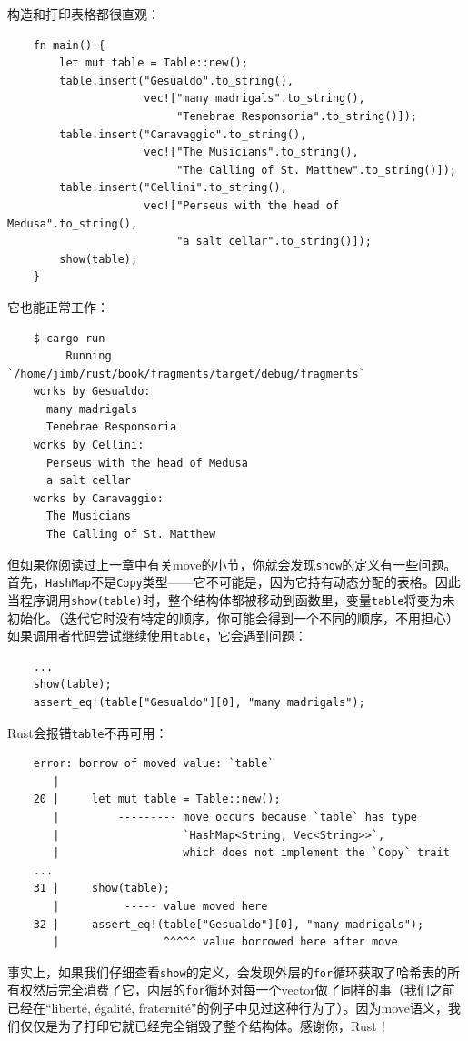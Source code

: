 构造和打印表格都很直观：
\begin{verbatim}
    fn main() {
        let mut table = Table::new();
        table.insert("Gesualdo".to_string(),
                     vec!["many madrigals".to_string(),
                          "Tenebrae Responsoria".to_string()]);
        table.insert("Caravaggio".to_string(),
                     vec!["The Musicians".to_string(),
                          "The Calling of St. Matthew".to_string()]);
        table.insert("Cellini".to_string(),
                     vec!["Perseus with the head of Medusa".to_string(),
                          "a salt cellar".to_string()]);
        show(table);
    }
\end{verbatim}

它也能正常工作：
\begin{verbatim}
    $ cargo run
         Running `/home/jimb/rust/book/fragments/target/debug/fragments`
    works by Gesualdo:
      many madrigals
      Tenebrae Responsoria
    works by Cellini:
      Perseus with the head of Medusa
      a salt cellar
    works by Caravaggio:
      The Musicians
      The Calling of St. Matthew
\end{verbatim}

但如果你阅读过上一章中有关move的小节，你就会发现\texttt{show}的定义有一些问题。首先，\texttt{HashMap}不是\texttt{Copy}类型——它不可能是，因为它持有动态分配的表格。因此当程序调用\texttt{show(table)}时，整个结构体都被移动到函数里，变量\texttt{table}将变为未初始化。（迭代它时没有特定的顺序，你可能会得到一个不同的顺序，不用担心）如果调用者代码尝试继续使用\texttt{table}，它会遇到问题：
\begin{verbatim}
    ...
    show(table);
    assert_eq!(table["Gesualdo"][0], "many madrigals");
\end{verbatim}

Rust会报错\texttt{table}不再可用：
\begin{verbatim}
    error: borrow of moved value: `table`
       |
    20 |     let mut table = Table::new();
       |         --------- move occurs because `table` has type
       |                   `HashMap<String, Vec<String>>`,
       |                   which does not implement the `Copy` trait
    ...
    31 |     show(table);
       |          ----- value moved here
    32 |     assert_eq!(table["Gesualdo"][0], "many madrigals");
       |                ^^^^^ value borrowed here after move
\end{verbatim}

事实上，如果我们仔细查看\texttt{show}的定义，会发现外层的\texttt{for}循环获取了哈希表的所有权然后完全消费了它，内层的\texttt{for}循环对每一个vector做了同样的事（我们之前已经在“liberté, égalité, fraternité”的例子中见过这种行为了）。因为move语义，我们仅仅是为了打印它就已经完全销毁了整个结构体。感谢你，Rust！

